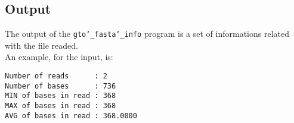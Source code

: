 \subsection*{Output}
The output of the \texttt{gto\char`_fasta\char`_info} program is a set of informations related with the file readed. \\
An example, for the input, is:
\begin{lstlisting}
Number of reads      : 2
Number of bases      : 736
MIN of bases in read : 368
MAX of bases in read : 368
AVG of bases in read : 368.0000
\end{lstlisting}